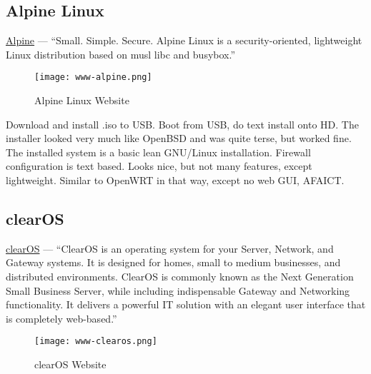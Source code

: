 \subsection{Alpine Linux}
 \href{https://www.alpinelinux.org/}{Alpine} --- ``Small. Simple. Secure. Alpine Linux is a security-oriented, lightweight Linux distribution based on musl libc and busybox.''

\begin{figure}[h!]
\texttt{[image: www-alpine.png]}
 \caption{Alpine Linux Website}
 \label{fig:www-alpine}
\end{figure}

Download and install .iso to USB. Boot from USB, do text install onto HD. The installer looked very much like OpenBSD and was quite terse, but worked fine.
The installed system is a basic lean GNU/Linux installation. Firewall configuration is text based. Looks nice, but not many features, except lightweight.
Similar to OpenWRT in that way, except no web GUI, AFAICT.


\subsection{clearOS}

\href{https://www.clearos.com/}{clearOS} --- ``ClearOS is an operating system for your Server, Network, and Gateway systems. It is designed for homes, small to medium businesses, and distributed environments. ClearOS is commonly known as the Next Generation Small Business Server, while including indispensable Gateway and Networking functionality. It delivers a powerful IT solution with an elegant user interface that is completely web-based.''

\begin{figure}[h!]
\texttt{[image: www-clearos.png]}
 \caption{clearOS Website}
 \label{fig:www-clearos}
\end{figure}

